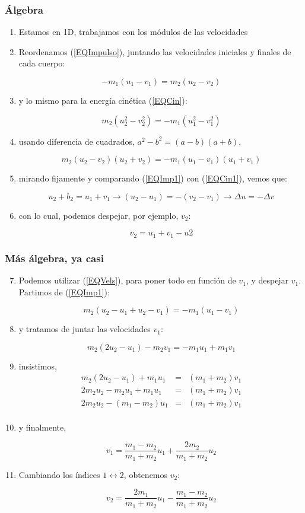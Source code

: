 \documentclass[xetex,mathserif,serif,10pt]{beamer}
\newcommand{\be}[2]{
  \vspace{-0.5em}
  \begin{equation}\label{#2}
    #1
  \end{equation}
  \vspace{-1em}
}
\begin{document}
\begin{frame}
\frametitle{Álgebra}
\begin{enumerate}
\item Estamos en 1D, trabajamos con los módulos de las velocidades
\item Reordenamos (\ref{EQImpulso}), juntando las velocidades iniciales y finales de cada cuerpo:
\be{
    - m_1 (u_1 - v_1) = m_2 (u_2-v_2)
}{EQImp1}
\item y lo mismo para la energía cinética (\ref{EQCin}):
\be{
m_2 (u_2^2 - v_2^2) = - m_1 (u_1^2 - v_1^2) \nonumber
}{EQCin0}
\item usando diferencia de cuadrados, $a^2-b^2=(a-b)(a+b)$,
\be{
m_2 (u_2-v_2)(u_2+v_2) = - m_1 (u_1 - v_1) (u_1+v_1)
}{EQCin1}
\item mirando fijamente y comparando (\ref{EQImp1}) con (\ref{EQCin1}), vemos que:
\be{u_2+b_2 = u_1 + v_1 \to (u_2 - u_1) = - (v_2 - v_1) \to \Delta u = - \Delta v
}{EQCin2}
\item con lo cual, podemos despejar, por ejemplo, $v_2$:
\be{v_2=u_1+v_1-u2}{EQVels}
\end{enumerate}
\end{frame}

\begin{frame}
\frametitle{Más álgebra, ya casi}
\begin{enumerate}
\setcounter{enumi}{6}      %
\item Podemos utilizar (\ref{EQVels}), para poner todo en función de $v_1$, y despejar $v_1$. Partimos de (\ref{EQImp1}):
\be{
    m_2(u_2 - u_1 + u_2 - v_1) = - m_1 (u_1 - v_1)
}{EQVel0}
\item y tratamos de juntar las velocidades $v_1$:
\be{
    m_2(2 u_2 - u_1) - m_2 v_1 = - m_1 u_1 + m_1 v_1
}{EQVel1}
\item insistimos,
\begin{eqnarray*}
    m_2 (2 u_2 - u_1) + m_1 u_1 &=& (m_1 + m_2) v_1 \\
    2 m_2 u_2 - m_2 u_1 + m_1 u_1 &=& (m_1 + m_2) v_1 \\
    2 m_2 u_2 - (m_1 - m_2) u_1 &=& (m_1 + m_2) v_1 \\
\end{eqnarray*}
\vspace{-1em}
\item y finalmente,
\be{
    v_1 = \frac{m_1 - m_2}{m_1 + m_2} u_1 + \frac{2 m_2}{m_1+m_2} u_2
}{EQV1}

\item Cambiando los índices $1 \leftrightarrow 2$, obtenemos $v_2$:
\be{
    v_2 = \frac{2 m_1}{m_1+m_2} u_1 - \frac{m_1-m_2}{m_1+m_2} u_2
}{EQV2}
\end{enumerate}
\end{frame}
\end{document}
